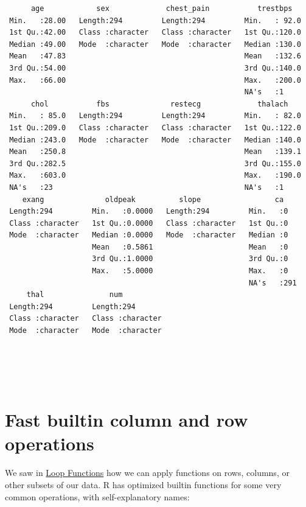 \documentclass[
]{book}
\begin{document}
\begin{verbatim}
      age            sex             chest_pain           trestbps    
 Min.   :28.00   Length:294         Length:294         Min.   : 92.0  
 1st Qu.:42.00   Class :character   Class :character   1st Qu.:120.0  
 Median :49.00   Mode  :character   Mode  :character   Median :130.0  
 Mean   :47.83                                         Mean   :132.6  
 3rd Qu.:54.00                                         3rd Qu.:140.0  
 Max.   :66.00                                         Max.   :200.0  
                                                       NA's   :1      
      chol           fbs              restecg             thalach     
 Min.   : 85.0   Length:294         Length:294         Min.   : 82.0  
 1st Qu.:209.0   Class :character   Class :character   1st Qu.:122.0  
 Median :243.0   Mode  :character   Mode  :character   Median :140.0  
 Mean   :250.8                                         Mean   :139.1  
 3rd Qu.:282.5                                         3rd Qu.:155.0  
 Max.   :603.0                                         Max.   :190.0  
 NA's   :23                                            NA's   :1      
    exang              oldpeak          slope                 ca     
 Length:294         Min.   :0.0000   Length:294         Min.   :0    
 Class :character   1st Qu.:0.0000   Class :character   1st Qu.:0    
 Mode  :character   Median :0.0000   Mode  :character   Median :0    
                    Mean   :0.5861                      Mean   :0    
                    3rd Qu.:1.0000                      3rd Qu.:0    
                    Max.   :5.0000                      Max.   :0    
                                                        NA's   :291  
     thal               num           
 Length:294         Length:294        
 Class :character   Class :character  
 Mode  :character   Mode  :character  
                                      
                                      
                                      
                                      
\end{verbatim}

\hypertarget{fast-builtin-column-and-row-operations}{%
\section{Fast builtin column and row operations}\label{fast-builtin-column-and-row-operations}}

We saw in \protect\hyperlink{loopfns}{Loop Functions} how we can apply functions on rows, columns, or other subsets of our data. R has optimized builtin functions for some very common operations, with self-explanatory names:
\end{document}
